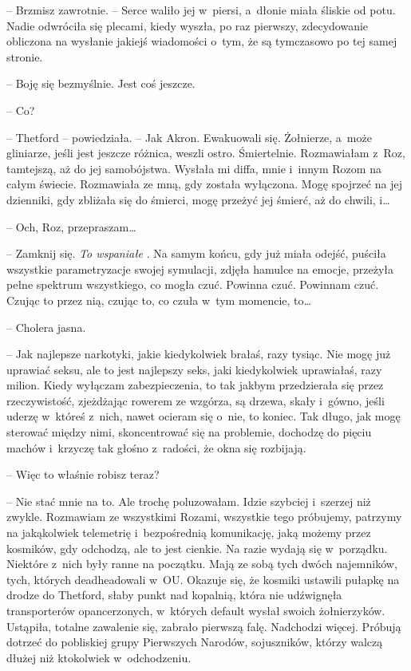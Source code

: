 \documentclass[oneside,polish,11pt,sfheadings]{mwbk}
\begin{document}
-- Brzmisz zawrotnie. -- Serce waliło jej w~piersi, a~dłonie miała śliskie
od potu. Nadie odwróciła się plecami, kiedy wyszła, po raz pierwszy,
zdecydowanie obliczona na wysłanie jakiejś wiadomości o~tym, że są
tymczasowo po tej samej stronie.

-- Boję się bezmyślnie. Jest coś jeszcze.

-- Co?

-- Thetford -- powiedziała. -- Jak Akron. Ewakuowali się. Żołnierze, a~może
gliniarze, jeśli jest jeszcze różnica, weszli ostro. Śmiertelnie.
Rozmawiałam z~Roz, tamtejszą, aż do jej samobójstwa. Wysłała mi diffa,
mnie i~innym Rozom na całym świecie. Rozmawiała ze mną, gdy została
wyłączona. Mogę spojrzeć na jej dzienniki, gdy zbliżała się do śmierci,
mogę przeżyć jej śmierć, aż do chwili, i\ldots 

-- Och, Roz, przepraszam\ldots 

-- Zamknij się. \textit{To wspaniałe }. Na samym końcu, gdy już miała
odejść, puściła wszystkie parametryzacje swojej symulacji, zdjęła
hamulce na emocje, przeżyła pełne spektrum wszystkiego, co mogła czuć.
Powinna czuć. Powinnam czuć. Czując to przez nią, czując to, co czuła w~tym momencie, to\ldots 

-- Cholera jasna.

-- Jak najlepsze narkotyki, jakie kiedykolwiek brałaś, razy tysiąc. Nie
mogę już uprawiać seksu, ale to jest najlepszy seks, jaki kiedykolwiek
uprawiałaś, razy milion. Kiedy wyłączam zabezpieczenia, to tak jakbym
przedzierała się przez rzeczywistość, zjeżdżając rowerem ze wzgórza, są
drzewa, skały i~gówno, jeśli uderzę w~któreś z~nich, nawet ocieram się o~nie, to koniec. Tak długo, jak mogę sterować między nimi, skoncentrować
się na problemie, dochodzę do pięciu machów i~krzyczę tak głośno z~radości, że okna się rozbijają.

-- Więc to właśnie robisz teraz?

-- Nie stać mnie na to. Ale trochę poluzowałam. Idzie szybciej i~szerzej
niż zwykle. Rozmawiam ze wszystkimi Rozami, wszystkie tego próbujemy,
patrzymy na jakąkolwiek telemetrię i~bezpośrednią komunikację, jaką
możemy przez kosmików, gdy odchodzą, ale to jest cienkie. Na razie
wydają się w~porządku. Niektóre z~nich były ranne na początku. Mają ze
sobą tych dwóch najemników, tych, których deadheadowali w~OU. Okazuje
się, że kosmiki ustawili pułapkę na drodze do Thetford, słaby punkt nad
kopalnią, która nie udźwignęła transporterów opancerzonych, w~których
default wysłał swoich żołnierzyków. Ustąpiła, totalne zawalenie się,
zabrało pierwszą falę. Nadchodzi więcej. Próbują dotrzeć do pobliskiej
grupy Pierwszych Narodów, sojuszników, którzy walczą dłużej niż
ktokolwiek w~odchodzeniu.
\end{document}
